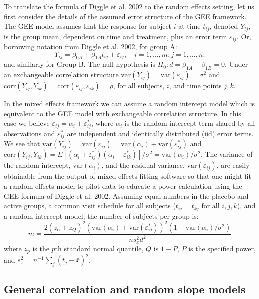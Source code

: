 \documentclass[12pt]{article}
\newcommand{\var}{\mathrm{var}}
\newcommand{\corr}{\mathrm{corr}}
\begin{document}
To translate the formula of Diggle et al. 2002 to the random effects setting, let us first consider the details of the assumed error structure of the GEE framework. The GEE model assumes that the response for subject $i$ at time $t_{ij}$, denoted $Y_{ij}$, is the group mean, dependent on time and treatment, plus an error term $\varepsilon_{ij}$. Or, borrowing notation from Diggle et al. 2002, for group A:
\[
Y_{ij} = \beta_{0A} + \beta_{1A}t_{ij} + \varepsilon_{ij},\quad i=1,\ldots,m; j=1,\ldots,n.
\]
and similarly for Group B. The null hypothesis is $H_0: d=\beta_{1A} - \beta_{1B} = 0$. Under an exchangeable correlation structure  $\var(Y_{ij})=\var(\varepsilon_{ij})=\sigma^2$ and $\corr(Y_{ij},Y_{ik})=\corr(\varepsilon_{ij}, \varepsilon_{ik})=\rho$, for all subjects, $i$, and time points $j, k$. 

In the mixed effects framework we can assume a random intercept model which is equivalent to the GEE model with exchangeable correlation structure. In this case we believe $\varepsilon_{ij} = \alpha_i + \varepsilon_{ij}^*$, where $\alpha_i$ is the random intercept term shared by all observations and $\varepsilon_{ij}^*$ are independent and identically distributed (iid) error terms. We see that $\var(Y_{ij})=\var(\varepsilon_{ij})=\var(\alpha_i) + \var(\varepsilon_{ij}^*)$ and $\corr(Y_{ij},Y_{ik})=E[(\alpha_i + \varepsilon_{ij}^*)(\alpha_i + \varepsilon_{ik}^*)]/\sigma^2=\var(\alpha_i)/\sigma^2$. The variance of the random intercept, $\var(\alpha_i)$, and the residual variance, $\var(\varepsilon_{ij})$, are easily obtainable from the output of mixed effects fitting software so that one might fit a random effects model to pilot data to educate a power calculation using the GEE formula of Diggle et al. 2002. Assuming equal numbers in the placebo and active groups, a common visit schedule for all subjects ($t_{ij} = t_{kj}$ for all $i,j,k$), and a random intercept model; the number of subjects per group is:
\[
m = \frac{2(z_\alpha + z_Q)^2(\var(\alpha_i) + \var(\varepsilon_{ij}^*))^2(1-\var(\alpha_i)/\sigma^2)}{ns_x^2d^2}
\]
where $z_p$ is the $p$th standard normal quantile, $Q$ is $1-P$, $P$ is the specified power, and $s_x^2=n^{-1}\sum_j(t_{j}-\bar x)^2$. 
\subsection{General correlation and random slope models}
\end{document}
